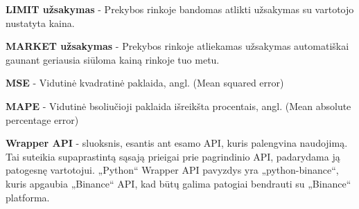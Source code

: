 \documentclass{VUMIFInfKursinis}
\begin{document}
\textbf{LIMIT užsakymas} - Prekybos rinkoje bandomas atlikti užsakymas su vartotojo nustatyta kaina.

\textbf{MARKET užsakymas} - Prekybos rinkoje atliekamas užsakymas automatiškai gaunant geriausia siūloma kainą rinkoje tuo metu.

\textbf{MSE} - Vidutinė kvadratinė paklaida, angl. (Mean squared error)

\textbf{MAPE} - Vidutinė  bsoliučioji paklaida išreikšta procentais, angl. (Mean absolute percentage error)

\textbf{Wrapper API} - sluoksnis, esantis ant esamo API, kuris palengvina naudojimą. Tai suteikia supaprastintą sąsają prieigai prie pagrindinio API, padarydama ją patogesnę vartotojui. „Python“ Wrapper API pavyzdys yra „python-binance“, kuris apgaubia „Binance“ API, kad būtų galima patogiai bendrauti su „Binance“ platforma.

\printbibliography[heading=bibintoc] %

\appendix  %
\end{document}
